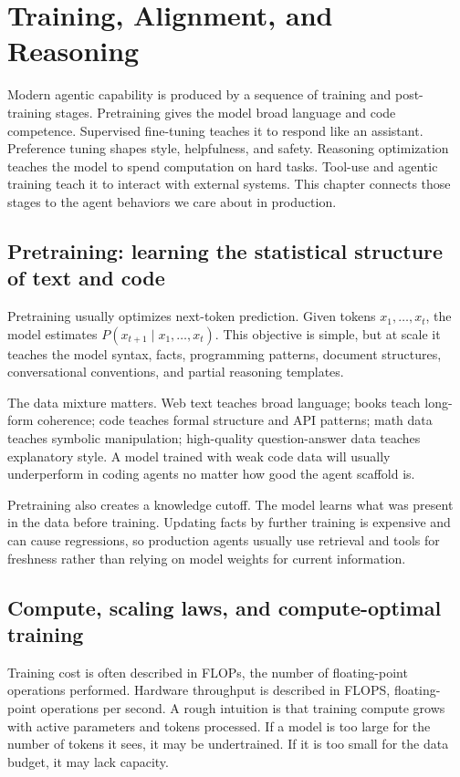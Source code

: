 \chapter{Training, Alignment, and Reasoning}

Modern agentic capability is produced by a sequence of training and post-training stages. Pretraining gives the model broad language and code competence. Supervised fine-tuning teaches it to respond like an assistant. Preference tuning shapes style, helpfulness, and safety. Reasoning optimization teaches the model to spend computation on hard tasks. Tool-use and agentic training teach it to interact with external systems. This chapter connects those stages to the agent behaviors we care about in production.

\section{Pretraining: learning the statistical structure of text and code}

Pretraining usually optimizes next-token prediction. Given tokens $x_1, \ldots, x_t$, the model estimates $P(x_{t+1} \mid x_1, \ldots, x_t)$. This objective is simple, but at scale it teaches the model syntax, facts, programming patterns, document structures, conversational conventions, and partial reasoning templates.

The data mixture matters. Web text teaches broad language; books teach long-form coherence; code teaches formal structure and API patterns; math data teaches symbolic manipulation; high-quality question-answer data teaches explanatory style. A model trained with weak code data will usually underperform in coding agents no matter how good the agent scaffold is.

Pretraining also creates a knowledge cutoff. The model learns what was present in the data before training. Updating facts by further training is expensive and can cause regressions, so production agents usually use retrieval and tools for freshness rather than relying on model weights for current information.

\section{Compute, scaling laws, and compute-optimal training}

Training cost is often described in FLOPs, the number of floating-point operations performed. Hardware throughput is described in FLOPS, floating-point operations per second. A rough intuition is that training compute grows with active parameters and tokens processed. If a model is too large for the number of tokens it sees, it may be undertrained. If it is too small for the data budget, it may lack capacity.

